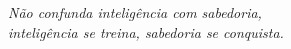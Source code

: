 \begin{epigrafe}
    \vspace*{\fill}
	\begin{flushright}

		\textit{Não confunda inteligência com sabedoria, \\
		inteligência se treina, sabedoria se conquista.}
	\end{flushright}
\end{epigrafe}
